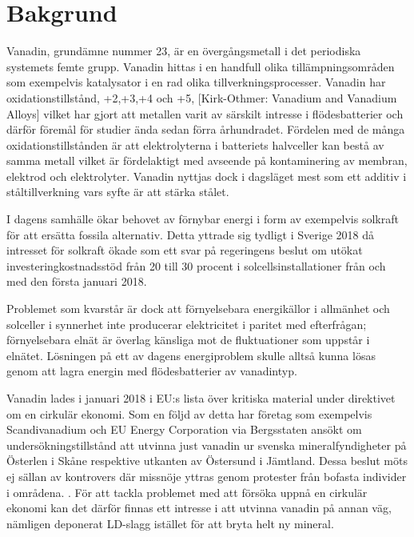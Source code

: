\documentclass{article}
\begin{document}
\begin{centering}
\end{centering}
\newpage
\thispagestyle{empty}
\thispagestyle{empty}
\tableofcontents
\thispagestyle{empty}
\newpage
{}

\section{Bakgrund}
Vanadin, grundämne nummer 23, är en övergångsmetall i det periodiska systemets femte grupp. Vanadin hittas i en handfull olika tillämpningsområden som exempelvis katalysator i en rad olika tillverkningsprocesser\cite{Pecoraro2014}.
Vanadin har oxidationstillstånd, +2,+3,+4 och +5, [Kirk-Othmer: Vanadium and Vanadium Alloys] \cite{Baroch2013} vilket har gjort att metallen varit av särskilt intresse i flödesbatterier och därför föremål för studier ända sedan förra århundradet\cite{Skyllas-Kazacos1987}.
Fördelen med de många oxidationstillstånden är att elektrolyterna i batteriets halvceller kan bestå av samma metall vilket är fördelaktigt med avseende på kontaminering av membran, elektrod och elektrolyter\cite{Lopez-Vizcaino2017}. 
Vanadin nyttjas dock i dagsläget mest som ett additiv i ståltillverkning vars syfte är att stärka stålet\cite{Baroch2013}.

I dagens samhälle ökar behovet av förnybar energi i form av exempelvis solkraft för att ersätta fossila alternativ. Detta yttrade sig tydligt i Sverige 2018 då intresset för solkraft ökade som ett svar på regeringens beslut om utökat investeringkostnadsstöd från 20 till 30 procent i solcellsinstallationer från och med den första januari 2018\cite{SverigesEnergimybn2009}.

Problemet som kvarstår är dock att förnyelsebara energikällor i allmänhet och solceller i synnerhet inte producerar elektricitet i paritet med efterfrågan; förnyelsebara elnät är överlag känsliga mot de fluktuationer som uppstår i elnätet. Lösningen på ett av dagens energiproblem skulle alltså kunna lösas genom att lagra energin med flödesbatterier av vanadintyp\cite{Lopez-Vizcaino2017}.


Vanadin lades i januari 2018 i EU:s lista över kritiska material under direktivet om en cirkulär ekonomi\cite{Navigation2018}. 
Som en följd av detta har företag som exempelvis Scandivanadium och EU Energy Corporation via Bergsstaten ansökt om undersökningstillstånd att utvinna just vanadin ur svenska mineralfyndigheter på Österlen i Skåne respektive utkanten av Östersund i Jämtland. Dessa beslut möts ej sällan av kontrovers där missnöje yttras genom protester från bofasta individer i områdena. \cite{NohrstedtLinda2018GruvforetagBatterier}. 
För att tackla problemet med att försöka uppnå en cirkulär ekonomi kan det därför finnas ett intresse i att utvinna vanadin på annan väg, nämligen deponerat LD-slagg istället för att bryta helt ny mineral.
\end{document}
